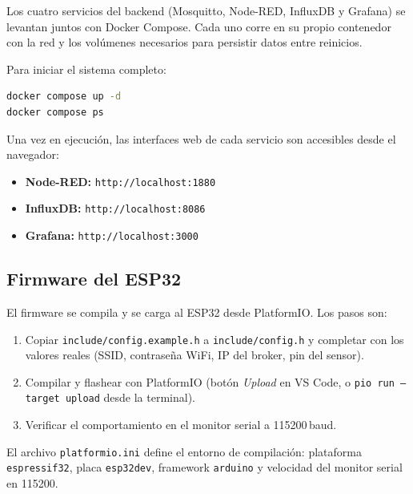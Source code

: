 \documentclass[12pt, a4paper]{article}
\begin{document}
Los cuatro servicios del backend (Mosquitto, Node-RED, InfluxDB y Grafana) se
levantan juntos con Docker Compose. Cada uno corre en su propio contenedor con
la red y los volúmenes necesarios para persistir datos entre reinicios.

Para iniciar el sistema completo:

\begin{lstlisting}[language=bash, caption={Inicio y verificación de los contenedores.}]
docker compose up -d
docker compose ps
\end{lstlisting}

Una vez en ejecución, las interfaces web de cada servicio son accesibles desde
el navegador:

\begin{itemize}
    \item \textbf{Node-RED:} \texttt{http://localhost:1880}
    \item \textbf{InfluxDB:} \texttt{http://localhost:8086}
    \item \textbf{Grafana:} \texttt{http://localhost:3000}
\end{itemize}

\subsection{Firmware del ESP32}

El firmware se compila y se carga al ESP32 desde PlatformIO. Los pasos son:

\begin{enumerate}
    \item Copiar \texttt{include/config.example.h} a \texttt{include/config.h} y
          completar con los valores reales (SSID, contraseña WiFi, IP del broker,
          pin del sensor).
    \item Compilar y flashear con PlatformIO (botón \textit{Upload} en VS Code,
          o \texttt{pio run --target upload} desde la terminal).
    \item Verificar el comportamiento en el monitor serial a 115200\,baud.
\end{enumerate}

El archivo \texttt{platformio.ini} define el entorno de compilación: plataforma
\texttt{espressif32}, placa \texttt{esp32dev}, framework \texttt{arduino} y
velocidad del monitor serial en 115200.

\end{document}
